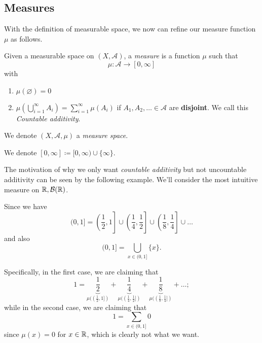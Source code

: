 \subsection{Measures}
With the definition of measurable space, we now can refine our measure function \(\mu\) as follows.
\begin{definition}[Measure]\label{def:measure}
	Given a measurable space on \((X, \mathcal{A}) \), a \emph{measure} is a function \(\mu\) such that
	\[
		\mu\colon \mathcal{A} \to [0, \infty]
	\]
	with
	\begin{enumerate}
		\item\label{def:measure-empty-measure} \(\mu(\varnothing ) = 0\)
		\item\label{def:measure-countable-additivity} \(\mu\left(\bigcup\limits_{i=1}^{\infty} A_{i}\right) = \sum\limits_{i=1}^{\infty}\mu(A_{i})\) if \(A_1, A_2, \ldots \in \mathcal{A}\)
		are \textbf{disjoint}. We call this \emph{Countable additivity}.
	\end{enumerate}
	We denote \((X, \mathcal{A} , \mu)\) a \emph{measure space}\label{def:measure-space}.
\end{definition}

\begin{notation}
	We denote \([0, \infty] \coloneqq [0, \infty) \cup \{\infty\}\).
\end{notation}

\begin{remark}
	The motivation of why we only want \emph{countable additivity} but not uncountable additivity can be seen by the following example. We'll consider
	the most intuitive measure on \(\mathbb{\MakeUppercase{R}} , \mathcal{B} (\mathbb{\MakeUppercase{R}})\).

	Since we have
	\[
		(0, 1] = \left.\left(\frac{1}{2}, 1\right.\right]\cup \left.\left(\frac{1}{4}, \frac{1}{2}\right.\right]\cup \left.\left(\frac{1}{8}, \frac{1}{4}\right.\right]\cup \ldots
	\]
	and also
	\[
		(0, 1] = \bigcup\limits_{x\in (0, 1]}\{x\}.
	\]

	Specifically, in the first case, we are claiming that
	\[
		1 = \underbrace{\frac{1}{2}}_{\mu((\frac{1}{2}, 1])} + \underbrace{\frac{1}{4}}_{\mu((\frac{1}{4}, \frac{1}{2}])} + \underbrace{\frac{1}{8}}_{\mu((\frac{1}{8}, \frac{1}{4}])}  + \ldots  ;
	\]
	while in the second case, we are claiming that
	\[
		1 = \sum\limits_{x\in(0, 1]} 0
	\]
	since \(\mu(x) = 0\) for \(x\in \mathbb{\MakeUppercase{R}} \), which is clearly not what we want.
\end{remark}

